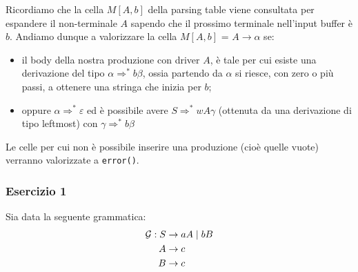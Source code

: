 \documentclass[class=book, crop=false, oneside, 12pt]{standalone}
\begin{document}
Ricordiamo che la cella \(M[A, b]\) della parsing table viene consultata per espandere il non-terminale \(A\) sapendo che il prossimo terminale nell'input buffer è \(b\). Andiamo dunque a valorizzare la cella \(M[A, b]\) = \(A \rightarrow \alpha\) se:

\begin{itemize}
    \item il body della nostra produzione con driver \(A\), è tale per cui esiste una derivazione del tipo \(\alpha \Rightarrow^* b \beta\), ossia partendo da \(\alpha\) si riesce, con zero o più passi, a ottenere una stringa che inizia per \(b\);
    \item oppure \(\alpha \Rightarrow^* \varepsilon\) ed è possibile avere \(S \Rightarrow^* w A \gamma\) (ottenuta da una derivazione di tipo leftmost) con \(\gamma \Rightarrow^* b \beta\)
\end{itemize}

Le celle per cui non è possibile inserire una produzione (cioè quelle vuote) verranno valorizzate a \texttt{error()}.

\subsubsection{Esercizio 1}

Sia data la seguente grammatica:
\begin{align*}
    \mathcal{G}: S &\rightarrow aA \mid bB \\
    A &\rightarrow c \\
    B &\rightarrow c
\end{align*}
\end{document}
